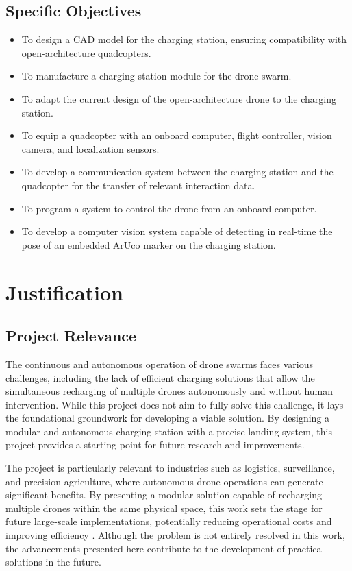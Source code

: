 \subsection{Specific Objectives}

\begin{itemize}
    \item To design a CAD model for the charging station, ensuring compatibility with open-architecture quadcopters.
    \item To manufacture a charging station module for the drone swarm.
    \item To adapt the current design of the open-architecture drone to the charging station.
    \item To equip a quadcopter with an onboard computer, flight controller, vision camera, and localization sensors.
    \item To develop a communication system between the charging station and the quadcopter for the transfer of relevant interaction data.
    \item To program a system to control the drone from an onboard computer.
    \item To develop a computer vision system capable of detecting in real-time the pose of an embedded ArUco marker on the charging station.
\end{itemize}

\section{Justification}

\subsection{Project Relevance}

The continuous and autonomous operation of drone swarms faces various challenges, including the lack of efficient charging solutions that allow the simultaneous recharging of multiple drones autonomously and without human intervention. While this project does not aim to fully solve this challenge, it lays the foundational groundwork for developing a viable solution. By designing a modular and autonomous charging station with a precise landing system, this project provides a starting point for future research and improvements.

The project is particularly relevant to industries such as logistics, surveillance, and precision agriculture, where autonomous drone operations can generate significant benefits. By presenting a modular solution capable of recharging multiple drones within the same physical space, this work sets the stage for future large-scale implementations, potentially reducing operational costs and improving efficiency \cite{marek2023}. Although the problem is not entirely resolved in this work, the advancements presented here contribute to the development of practical solutions in the future.


